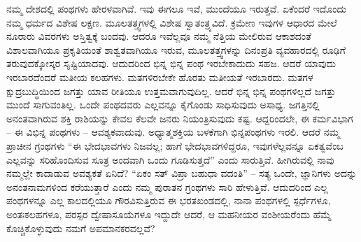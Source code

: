 ನಮ್ಮ ದೇಶದಲ್ಲಿ ಪಂಥಗಳು ಹೇರಳವಾಗಿವೆ. ಇವು ಈಗಲೂ ಇವೆ, ಮುಂದೆಯೂ ಇರುತ್ತವೆ. ಏಕೆಂದರೆ ಇದೊಂದು ನಮ್ಮ ಧರ್ಮದ ವಿಶೇಷ ಲಕ್ಷಣ. ಮೂಲತತ್ತ್ವಗಳಲ್ಲಿ ವಿಶೇಷ ಸ್ವಾತಂತ್ರ್ಯವಿದೆ. ಕ್ರಮೇಣ ಇವುಗಳ ಆಧಾರದ ಮೇಲೆ ನೂರಾರು ವಿವರಗಳು ಅಸ್ತಿತ್ವಕ್ಕೆ ಬಂದವು. ಆದರೂ ಇವೆಲ್ಲವೂ ನಮ್ಮ ನೆತ್ತಿಯ ಮೇಲಿರುವ ಆಕಾಶದಂತೆ ವಿಶಾಲವಾಗಿಯೂ ಪ್ರಕೃತಿಯಂತೆ ಶಾಶ್ವತವಾಗಿಯೂ ಇರುವ, ಮೂಲತತ್ತ್ವಗಳನ್ನು ದಿನಂಪ್ರತಿ ವ್ಯವಹಾರದಲ್ಲಿ ರೂಢಿಗೆ ತರುವುದಕ್ಕೋಸ್ಕರ ಸೃಷ್ಟಿಯಾದವು. ಆದುದರಿಂದ ಭಿನ್ನ ಭಿನ್ನ ಪಂಥ ಇರಬೇಕಾದುದು ಸಹಜ. ಆದರೆ ಯಾವುದು ಇರಬಾರದೆಂದರೆ ಮತೀಯ ಕಲಹಗಳು. ಮತಗಳಿರಬೇಕೇ ಹೊರತು ಮತೀಯತೆ ಇರಬಾರದು. ಮತಗಳ ಕ್ಷುದ್ರಬುದ್ಧಿಯಿಂದ ಜಗತ್ತು ಯಾವ ರೀತಿಯೂ ಉತ್ತಮವಾಗುವುದಿಲ್ಲ. ಆದರೆ ಭಿನ್ನ ಭಿನ್ನ ಪಂಥಗಳಿಲ್ಲದೆ ಜಗತ್ತು ಮುಂದೆ ಸಾಗುವಂತಿಲ್ಲ. ಒಂದೇ ಪಂಥದವರು ಎಲ್ಲವನ್ನೂ ಕೈಗೊಂಡು ಸಾಧಿಸುವುದು ಅಸಾಧ್ಯ. ಜಗತ್ತಿನಲ್ಲಿ ಅನಂತವಾಗಿರುವ ಶಕ್ತಿ ರಾಶಿಯನ್ನು ಕೇವಲ ಕೆಲವೇ ಜನರು ನಿಯಂತ್ರಿಸುವುದು ಕಷ್ಟ. ಆದ್ದರಿಂದಲೇ, ಈ ಕರ್ಮವಿಭಾಗ – ಈ ವಿಭಿನ್ನ ಪಂಥಗಳು – ಆವಶ್ಯಕವಾದುವು. ಅಧ್ಯಾತ್ಮಶಕ್ತಿಯ ಬಳಕೆಗಾಗಿ ಭಿನ್ನಪಂಥಗಳು ಇರಲಿ. ಆದರೆ ನಮ್ಮ ಪ್ರಾಚೀನ ಗ್ರಂಥಗಳು “ಈ ಭೇದಭಾವಗಳು ನಿಜವಲ್ಲ; ಹಾಗೆ ಭೇದಭಾವಗಳಿದ್ದರೂ, ಇವುಗಳೆಲ್ಲವನ್ನೂ ಏಕತ್ವವೆಂಬ ಎಲ್ಲವನ್ನು ಸರಿಹೊಂದಿಸುವ ಸೂತ್ರ ಅಂದವಾಗಿ ಒಂದು ಗೂಡಿಸುತ್ತದೆ” ಎಂದು ಸಾರುತ್ತಿವೆ. ಹೀಗಿರುವಲ್ಲಿ ನಾವು ನಮ್ಮಲ್ಲೇ ಕಾದಾಡುವ ಅವಶ್ಯಕತೆ ಏನಿದೆ? “ಏಕಂ ಸತ್​ ವಿಪ್ರಾ ಬಹುಧಾ ವದಂತಿ” – ಸತ್ಯ ಒಂದೇ, ಜ್ಞಾನಿಗಳು ಅದನ್ನು ಅನಂತನಾಮಗಳಿಂದ ಕರೆಯುತ್ತಾರೆ ಎಂದು ನಮ್ಮ ಪುರಾತನ ಗ್ರಂಥಗಳು ಸಾರಿ ಹೇಳುತ್ತಿವೆ. ಆದುದರಿಂದ ಎಲ್ಲ ಪಂಥಗಳನ್ನೂ ಎಲ್ಲ ಕಾಲದಲ್ಲಿಯೂ ಗೌರವಿಸುತ್ತಿರುವ ಈ ಭರತಖಂಡದಲ್ಲಿ, ನಾನಾ ಪಂಥಗಳಲ್ಲಿ ಸ್ಪರ್ಧೆಗಳೂ, ಅಂತಃಕಲಹಗಳೂ, ಪರಸ್ಪರ ದ್ವೇಷಾಸೂಯೆಗಳೂ ಇದ್ದುದೇ ಆದರೆ, ಆ ಮಹನೀಯರ ವಂಶೀಯರೆಂದು ಹೆಮ್ಮೆ ಕೊಚ್ಚಿಕೊಳ್ಳುವುದು ನಮಗೆ ಅಪಮಾನಕರವಲ್ಲವೆ?

